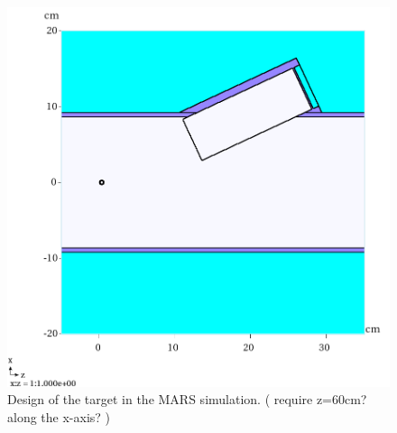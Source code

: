 \documentclass[a4paper,11pt]{article}
\begin{document}
\begin{figure}[t!]
  \begin{center}
    \includegraphics[width=1.0\columnwidth]{./figures/XZGeom-v6-Q1-y=6cm-Zoom.png}
    \caption{Design of the target in the MARS simulation. ( require z=60cm?along the x-axis? ) }
    \label{fig:MARSwindow}
  \end{center}
\end{figure}
\end{document}
